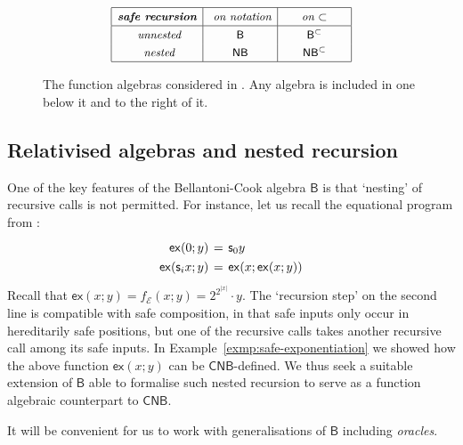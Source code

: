 \documentclass[manuscript,screen]{acmart}
\theoremstyle{definition}
\theoremstyle{remark}
\newcommand{\permpref}{\subset}
\renewcommand{\succ}[1]{\mathsf{s}_{#1}}
\newcommand{\s}[1]{\vert {#1}\vert}
\newcommand{\ex}{\mathsf{ex}}
\newcommand{\sexp}{\mathcal{E}}
\newcommand{\bc}{\mathsf{B}}
\newcommand{\bcwfpo}[1]{\bc^{#1}}
\newcommand{\nested}{\mathsf{N}}
\newcommand{\nbc}{\nested\bc}
\newcommand{\nbcwfpo}[1]{\nested\bcwfpo{#1}}
\newcommand{\shallow}{\mathsf{S}}
\newcommand{\sbc}{\shallow\bc}
\newcommand{\sbcwfpo}[1]{\sbc^{#1}}
\newcommand{\bcpp}{\bcwfpo{\permpref}}
\newcommand{\nbcpp}{\nbcwfpo{\permpref}}
\newcommand{\sbcpp}{\sbcwfpo\permpref}
\newcommand{\cyclic}{\mathsf{C}}
\newcommand{\ncbc}{\cyclic\nested\bc}
\begin{document}
\begin{figure}[t]
    \[
    \small
   \def\arraystretch{1.3}
    \begin{array}{|c|c|c|}
    \hline
     \textit{\textbf{safe recursion}} & \textit{ on notation} &\textit{ on $\permpref$ }\\       \hline
        \textit{ unnested}& \qquad \bc\qquad  & \qquad \bcpp \qquad \\
        \textit{ nested} &  \nbc  & \nbcpp \\ \hline 
    \end{array}
    \]
        \caption{The function algebras considered in . Any algebra is included in one below it and to the right of it.}
    \label{fig:function-algebras-table}
\end{figure}


\subsection{Relativised algebras and nested recursion}
One of the key features of the Bellantoni-Cook algebra $\bc$ is that `nesting' of recursive calls is not permitted.
For instance, let us recall the equational program from :
\begin{equation}
 \arraycolsep=2pt
    \label{eq:safe-exp-by-snrec}
    \begin{array}{rcl}
    \ex(0;y) & = & \succ 0 y \\
    \ex(\succ i x ; y) & = & \ex(x;\ex(x;y))
\end{array}
\end{equation}
Recall that $\ex(x;y)=f_\sexp (x;y) = 2^{2^{\s{x}}}\cdot y$.
The `recursion step' on the second line is compatible with safe composition, in that safe inputs only occur in hereditarily safe positions, but one of the recursive calls takes another recursive call among its safe inputs.
% 
In Example~\ref{exmp:safe-exponentiation}  we showed how  the above function  $\ex(x;y)$ can be   $\ncbc$-defined. 
We thus seek a suitable extension of $\bc$ able to formalise such nested recursion to serve as a function algebraic counterpart to $\ncbc$. 

It will be convenient for us to work with generalisations of  $\bc$ including \emph{oracles}.  
\end{document}
